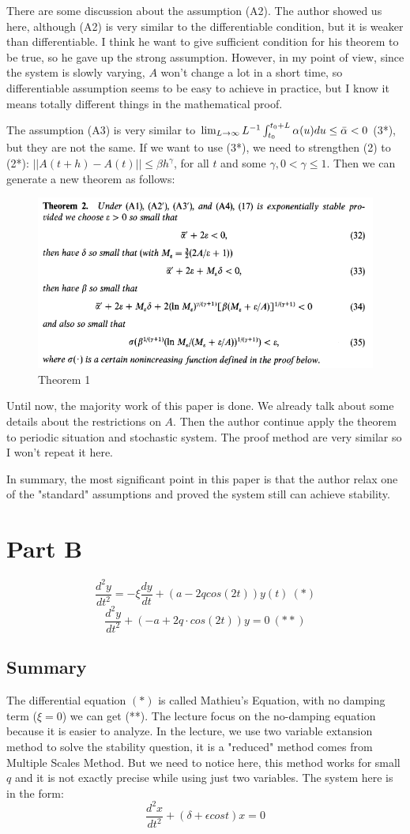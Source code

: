 \documentclass{article}
\begin{document}
There are some discussion about the assumption (A2). The author showed us here, although (A2) is very similar to the differentiable condition, but it is weaker than differentiable. I think he want to give sufficient condition for his theorem to be true, so he gave up the strong assumption. However, in my point of view, since the system is slowly varying, $A$ won't change a lot in a short time, so differentiable assumption seems to be easy to achieve in practice, but I know it means totally different things in the mathematical proof.

The assumption (A3) is very similar to $\lim_{L \rightarrow \infty} L^{-1} \int_{t_0}^{t_0 + L} \alpha(u) du \leq \Bar{\alpha} < 0$ (3*), but they are not the same.  If we want to use (3*), we need to strengthen (2) to (2*): $||A(t+h)-A(t)|| \leq \beta h^{\gamma}$, for all $t$ and some $\gamma, 0<\gamma \leq 1$. Then we can generate a new theorem as follows:

\begin{figure}[H]
\centering
\includegraphics[width=0.7\linewidth]{Ref_4_Theorem_2.png}
\caption{Theorem 1}
\label{4_3A13}
\end{figure}

Until now, the majority work of this paper is done. We already talk about some details about the restrictions on $A$. Then the author continue apply the theorem to periodic situation and stochastic system. The proof method are very similar so I won't repeat it here. 

In summary, the most significant point in this paper is that the author relax one of the "standard" assumptions and proved the system still can achieve stability. 

\section{Part B}
$$\frac{d^2 y}{d t^2} = -\xi \frac{d y}{d t} + (a - 2 q cos(2t))y(t) \ (*)$$
$$\frac{d^2 y}{d t^2} + (-a + 2q \cdot cos(2t))y = 0 \ (**)$$
\subsection{Summary}
The differential equation $(*)$ is called Mathieu's Equation, with no damping term ($\xi = 0$) we can get (**). The lecture focus on the no-damping equation because it is easier to analyze. In the lecture, we use two variable extansion method to solve the stability question, it is a "reduced" method comes from Multiple Scales Method. But we need to notice here, this method works for small $q$ and it is not exactly precise while using just two variables. The system here is in the form:
$$\frac{d^2 x}{d t^2} + (\delta + \epsilon cos t)x = 0$$
\end{document}
